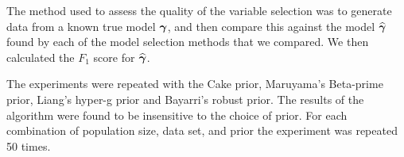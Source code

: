 	
		

The method used to assess the quality of the variable selection was to generate
data from a known true model ${\boldsymbol \gamma}$, and then compare this against the model
$\widehat{{\boldsymbol \gamma}}$ found by each of the model selection methods that we
compared. We then calculated the $F_1$ score for $\widehat{{\boldsymbol \gamma}}$.





The experiments were repeated with 
the Cake prior, Maruyama's Beta-prime prior, Liang's hyper-g prior and Bayarri's robust prior.
The results of the algorithm were found to be insensitive to the choice of prior.
For each combination of population size, data set, and prior the experiment was repeated 50 times.



